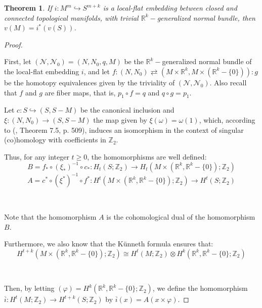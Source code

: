 \documentclass[12pt,oneside]{book}
\newtheorem{teo}    {Theorem}[chapter]
\newcommand{\R}{\mathbb{R}}
\newcommand{\Z}{\mathbb{Z}}
\newcommand{\tensor}{\otimes}
\begin{document}
    \begin{teo}\label{ap_wu_8}
	If $i:M^{m}\hookrightarrow S^{m+k}$ is a local-flat embedding between closed and connected topological 
    manifolds, with trivial $\R^{k}-$generalized normal 
    bundle, then $v(M)=i^{*}(v(S))$.
    \end{teo}

    \begin{proof}

        \

        First, let $(\mathcal{N},\mathcal{N}_{0})=(N,N_{0},q,M)$ be the $\R^{k}-$generalized normal bundle of 
        the local-flat embedding $i$, and let 
        $f:(N,N_{0})\rightleftarrows (M\times\R^{k},M\times (\R^{k}-\{0\})):g$ be the homotopy equivalences given by the triviality of 
        $(\mathcal{N},\mathcal{N}_{0})$. Also recall that $f$ and $g$ are fiber maps, that is, $p_{1}\circ f=q$ and 
        $q\circ g=p_{1}$.
        
        Let $c:S\hookrightarrow (S,S-M)$ be the canonical inclusion and $\xi:(N,N_{0})\to (S,S-M)$ the map given by $\xi(\omega)=\omega(1)$, 
        which, according to (\cite{fadell_1}, Theorem 7.5, p. 509), induces an isomorphism in the context of singular 
        (co)homology with coefficients in $\Z_{2}$.
        
        Thus, for any integer $t\geq 0$, the homomorphisms are well defined:
        $$ B=f_{*}\circ (\xi_{*})^{-1}\circ c_{*}:H_{t}(S;\Z_{2})\to H_{t}(M\times (\R^{k},\R^{k}-\{0\});\Z_{2}) $$
        $$ A=c^{*}\circ (\xi^{*})^{-1}\circ f^{*}:H^{t}(M\times (\R^{k},\R^{k}-\{0\});\Z_{2})\to H^{t}(S;\Z_{2}) $$

        \
        
        Note that the homomorphism $A$ is the cohomological dual of the homomorphism $B$.
        
        Furthermore, we also know that the Künneth formula ensures that:
        $$ H^{t+k}(M\times (\R^{k},\R^{k}-\{0\});\Z_{2})\cong H^{t}(M;\Z_{2})\tensor H^{k}(\R^{k},\R^{k}-\{0\};\Z_{2}) $$

        \
        
        Then, by letting $(\varphi)=H^{k}(\R^{k},\R^{k}-\{0\};\Z_{2})$, we define the homomorphism 
        $\overline{i}:H^{t}(M;\Z_{2})\to H^{t+k}(S;\Z_{2})$ by $\overline{i}(x)=A(x\times \varphi)$.


\end{proof}
\end{document}
